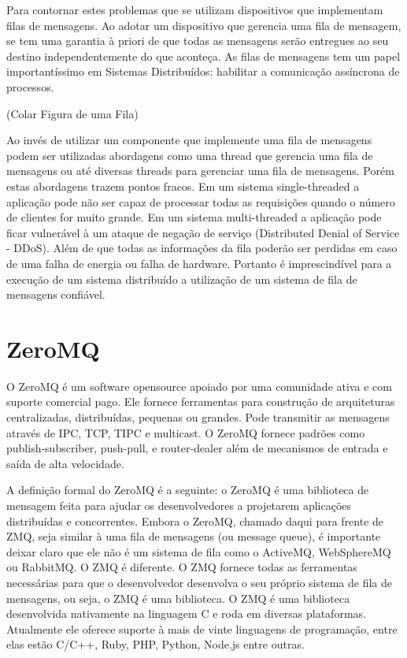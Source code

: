 \documentclass[12pt]{article}
\begin{document}
Para contornar estes problemas que se utilizam dispositivos que implementam filas de mensagens. Ao adotar um
dispositivo que gerencia uma fila de mensagem, se tem uma garantia à priori de que todas as mensagens serão 
entregues ao seu destino independentemente do que aconteça. As filas de mensagens tem um papel importantíssimo
em Sistemas Distribuídos: habilitar a comunicação assíncrona de processos.

(Colar Figura de uma Fila)

Ao invés de utilizar um componente que implemente uma fila de mensagens podem ser utilizadas abordagens como 
uma thread que gerencia uma fila de mensagens ou até diversas threads para gerenciar uma fila de mensagens.
Porém estas abordagens trazem pontos fracos. Em um sistema single-threaded a aplicação pode não ser capaz de
processar todas as requisições quando o número de clientes for muito grande. Em um sistema multi-threaded a 
aplicação pode ficar vulnerável à um ataque de negação de serviço (Distributed Denial of Service - DDoS). 
Além de que todas as informações da fila poderão ser perdidas em caso de uma falha de energia ou falha de 
hardware. Portanto é imprescindível para a execução de um sistema distribuído a utilização de um sistema de 
fila de mensagens confiável.

\section{ZeroMQ} \label{sec:firstpage}
O ZeroMQ é um software opensource apoiado por uma comunidade ativa e com suporte comercial pago. 
Ele fornece ferramentas para construção de arquiteturas centralizadas, distribuídas, pequenas ou grandes.
Pode transmitir as mensagens através de IPC, TCP, TIPC e multicast. O ZeroMQ fornece padrões como 
publish-subscriber, push-pull, e router-dealer além de mecanismos de entrada e saída de alta velocidade.

A definição formal do ZeroMQ é a seguinte: o ZeroMQ é uma biblioteca de mensagem feita para
ajudar os desenvolvedores a projetarem aplicações distribuídas e concorrentes. Embora o ZeroMQ, 
chamado daqui para frente de ZMQ, seja similar à uma fila de mensagens (ou message queue), é
importante deixar claro que ele não é um sistema de fila como o ActiveMQ, WebSphereMQ ou RabbitMQ.
O ZMQ é diferente. O ZMQ fornece todas as ferramentas necessárias para que o desenvolvedor desenvolva
o seu próprio sistema de fila de mensagens, ou seja, o ZMQ é uma biblioteca.
O ZMQ é uma biblioteca desenvolvida nativamente na linguagem C e roda em diversas plataformas. 
Atualmente ele oferece suporte à mais de vinte linguagens de programação, entre elas estão C/C++, Ruby, 
PHP, Python, Node.js entre outras.
\end{document}

